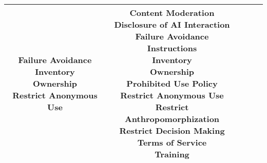 \documentclass[fleqn]{article}
\begin{document}
\begin{landscape}
\begin{table}[H]
\begin{tabular}{|c|c|c|c|c|}
{			\textbullet\hspace{3pt} Failure Avoidance\\ 	
			\textbullet\hspace{3pt} Inventory\\ 	
			\textbullet\hspace{3pt} Ownership\\ 
			\textbullet\hspace{3pt} Restrict Anonymous Use\\ 				
		} &
		\makecell[l]{ 	
			\textbullet\hspace{3pt} Content Moderation\\ 	
			\textbullet\hspace{3pt} Disclosure of AI Interaction\\ 	
			\textbullet\hspace{3pt} Failure Avoidance\\ 	
			\textbullet\hspace{3pt} Instructions\\ 	
			\textbullet\hspace{3pt} Inventory\\ 	
			\textbullet\hspace{3pt} Ownership\\ 	
			\textbullet\hspace{3pt} Prohibited Use Policy\\ 	
			\textbullet\hspace{3pt} Restrict Anonymous Use\\ 	
			\textbullet\hspace{3pt} Restrict Anthropomorphization\\ 	
			\textbullet\hspace{3pt} Restrict Decision Making\\ 			
			\textbullet\hspace{3pt} Terms of Service\\ 	
			\textbullet\hspace{3pt} Training\\
		}
		\\
		\hline
	\end{tabular}
	\label{table:low_risk_plan_by_gai_risk_cont}
\end{table}

\vfill
\raisebox{-10pt}{\makebox[\linewidth]{\thepage}}

\end{landscape}

\pagebreak
\end{document}
